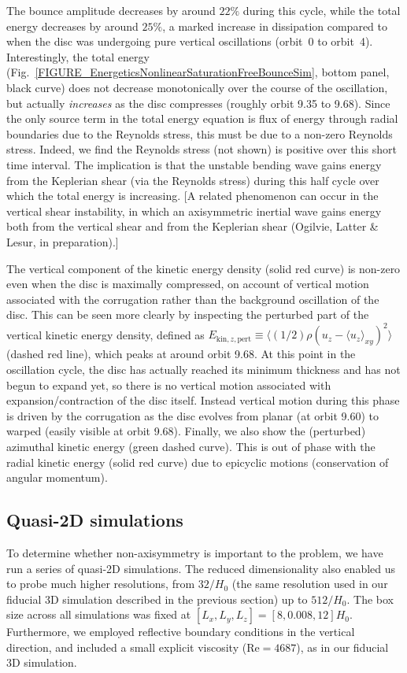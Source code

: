 \documentclass[fleqn,usenatbib]{mnras}
\begin{document}
The bounce amplitude decreases by around $22\%$ during this cycle, while the total energy decreases by around $25\%$, a marked increase in dissipation compared to when the disc was undergoing pure vertical oscillations (orbit~0 to orbit~4). Interestingly, the total energy (Fig.~\ref{FIGURE_EnergeticsNonlinearSaturationFreeBounceSim}, bottom panel, black curve) does not decrease monotonically over the course of the oscillation, but actually \textit{increases} as the disc compresses (roughly orbit 9.35 to 9.68). Since the only source term in the total energy equation is flux of energy through radial boundaries due to the Reynolds stress, this must be due to a non-zero Reynolds stress. Indeed, we find the Reynolds stress (not shown) is positive over this short time interval. The implication is that the unstable bending wave gains energy from the Keplerian shear (via the Reynolds stress) during this half cycle over which the total energy is increasing. [A related phenomenon can occur in the vertical shear instability, in which an axisymmetric inertial wave gains energy both from the vertical shear and from the Keplerian shear (Ogilvie, Latter \& Lesur, in preparation).]

The vertical component of the kinetic energy density (solid red curve) is non-zero even when the disc is maximally compressed, on account of vertical motion associated with the corrugation rather than the background oscillation of the disc. This can be seen more clearly by inspecting the perturbed part of the vertical kinetic energy density, defined as $E_{\text{kin},z,\text{pert}} \equiv \langle (1/2)\rho (u_z-\langle u_z \rangle_{xy})^2 \rangle$ (dashed red line), which peaks at around orbit 9.68. At this point in the oscillation cycle, the disc has actually reached its minimum thickness and has not begun to expand yet, so there is no vertical motion associated with expansion/contraction of the disc itself. Instead vertical motion during this phase is driven by the corrugation as the disc evolves from planar (at orbit 9.60) to warped (easily visible at orbit 9.68). Finally, we also show the (perturbed) azimuthal kinetic energy (green dashed curve). This is out of phase with the radial kinetic energy (solid red curve) due to epicyclic motions (conservation of angular momentum).


\subsection{Quasi-2D simulations}
\label{SECTION_FreeBounceQuasi2DSimulations}
To determine whether non-axisymmetry is important to the problem, we have run a series of quasi-2D simulations. The reduced dimensionality also enabled us to probe much higher resolutions, from $32/H_0$ (the same resolution used in our fiducial 3D simulation described in the previous section) up to $512/H_0$. The box size across all simulations was fixed at $[L_x, L_y, L_z] = [8,0.008,12]H_0$. Furthermore, we employed reflective boundary conditions in the vertical direction, and included a small explicit viscosity ($\text{Re} = 4687$), as in our fiducial 3D simulation.
\end{document}
